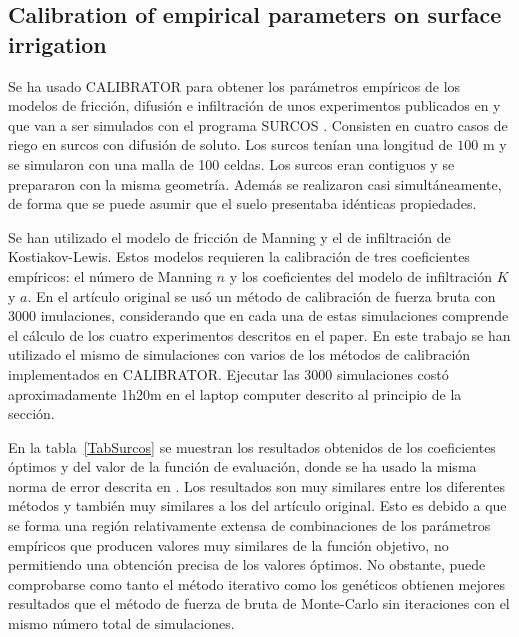 \documentclass[review,authoryear]{elsarticle}
\begin{document}
\subsection{Calibration of empirical parameters on surface irrigation}

Se ha usado CALIBRATOR para obtener los parámetros empíricos de los modelos de
fricción, difusión e infiltración de unos experimentos publicados en
\citet{JaviSurcos2} y que van a ser simulados con el programa SURCOS
\citep{Surcos,SurcosGit,JaviSurcos3}. Consisten en cuatro casos de riego en
surcos con difusión de soluto. Los surcos tenían una longitud de $100$ m y se simularon con una malla de 100 celdas. Los surcos eran contiguos y se prepararon
con la misma geometría. Además se realizaron casi simultáneamente, de forma que
se puede asumir que el suelo presentaba idénticas propiedades.

Se han utilizado el modelo de fricción de Manning y el de infiltración de
Kostiakov-Lewis. Estos modelos requieren la calibración de tres coeficientes
empíricos: el número de Manning $n$ y los coeficientes del modelo de
infiltración $K$ y $a$. En el artículo original se usó un método de calibración
de fuerza bruta con 3000  imulaciones, considerando que en cada una de estas
simulaciones comprende el cálculo de los cuatro experimentos descritos en el
paper. En este trabajo se han utilizado el mismo de simulaciones con varios de
los métodos de calibración implementados en CALIBRATOR. Ejecutar las 3000
simulaciones costó aproximadamente 1h20m en el laptop computer descrito al
principio de la sección.

En la tabla~\ref{TabSurcos} se muestran los resultados obtenidos de los
coeficientes óptimos y del valor de la función de evaluación,
donde se ha usado la misma norma de error descrita en \citet{JaviSurcos2}. Los
resultados son muy similares entre los diferentes métodos y también muy
similares a los del artículo original. Esto es debido a que se forma una región
relativamente extensa de combinaciones de los parámetros empíricos que producen
valores muy similares de la función objetivo, no permitiendo una obtención
precisa de los valores óptimos. No obstante, puede comprobarse como tanto el
método iterativo como los genéticos obtienen mejores resultados que el método de
fuerza de bruta de Monte-Carlo sin iteraciones con el mismo número total de
simulaciones.
\end{document}
